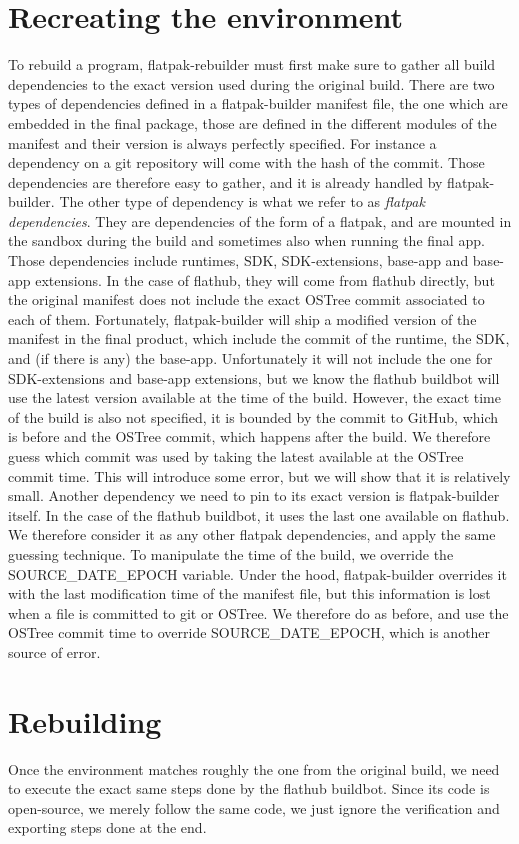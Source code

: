 \documentclass[a4paper,11pt,oneside]{report}
\theoremstyle{definition}
\newcommand{\sysname}{flatpak-rebuilder\xspace}
\newcommand{\fp}{flatpak\xspace}
\newcommand{\fh}{flathub\xspace}
\newcommand{\fb}{flatpak-builder\xspace}
\newcommand{\fdp}{flatpak dependencies\xspace}
\newcommand{\sde}{SOURCE\_DATE\_EPOCH\xspace}
\newcommand{\fhbb}{flathub buildbot\xspace}
\newcommand{\ot}{OSTree\xspace}
\begin{document}
\section{Recreating the environment}
To rebuild a program, \sysname must first make sure to gather all build
dependencies to the exact version used during the original build. There are two
types of dependencies defined in a \fb manifest file, the one which are
embedded in the final package, those are defined in the different modules of
the manifest and their version is always perfectly specified. For instance a
dependency on a git repository will come with the hash of the commit. Those
dependencies are therefore easy to gather, and it is already handled by \fb.
The other type of dependency is what we refer to as \emph{\fdp}. They are
dependencies of the form of a \fp, and are mounted in the sandbox during the
build and sometimes also when running the final app. Those dependencies include
runtimes, SDK, SDK-extensions, base-app and base-app extensions. In the case of
\fh, they will come from \fh directly, but the original manifest does not
include the exact \ot commit associated to each of them. Fortunately, \fb will
ship a modified version of the manifest in the final product, which include the
commit of the runtime, the SDK, and (if there is any) the base-app.
Unfortunately it will not include the one for SDK-extensions and base-app
extensions, but we know the \fhbb will use the latest version available at the
time of the build. However, the exact time of the build is also not specified,
it is bounded by the commit to GitHub, which is before and the \ot commit,
which happens after the build. We therefore guess which commit was used by
taking the latest available at the \ot commit time. This will introduce some
error, but we will show that it is relatively small. Another dependency we need
to pin to its exact version is \fb itself. In the case of the \fhbb, it uses
the last one available on \fh. We therefore consider it as any other \fdp, and
apply the same guessing technique.
To manipulate the time of the build, we override the \sde variable. Under the
hood, \fb overrides it with the last modification time of the manifest file,
but this information is lost when a file is committed to git or \ot . We
therefore do as before, and use the \ot commit time to override \sde, which is
another source of error.

\section{Rebuilding}
Once the environment matches roughly the one from the original build, we need
to execute the exact same steps done by the \fhbb. Since its code is
open-source, we merely follow the same code, we just ignore the verification
and exporting steps done at the end.
\end{document}
